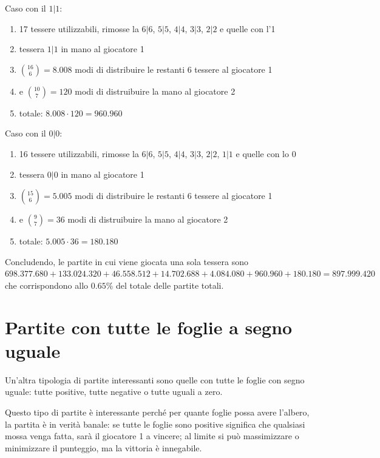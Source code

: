 \documentclass[a4paper,12pt]{report}
\begin{document}
Caso con il \(1|1\):
\begin{enumerate}
    \item 17 tessere utilizzabili, rimosse la \(6|6\), \(5|5\), \(4|4\), \(3|3\), \(2|2\) e quelle con l'1
    \item tessera \(1|1\) in mano al giocatore 1
    \item \(\binom{16}{6} = 8.008\) modi di distribuire le restanti 6 tessere al giocatore 1
    \item e \(\binom{10}{7} = 120\) modi di distruibuire la mano al giocatore 2
    \item totale: \( 8.008 \cdot 120 = 960.960 \)
\end{enumerate}

Caso con il \(0|0\):
\begin{enumerate}
    \item 16 tessere utilizzabili, rimosse la \(6|6\), \(5|5\), \(4|4\), \(3|3\), \(2|2\), \(1|1\) e quelle con lo 0
    \item tessera \(0|0\) in mano al giocatore 1
    \item \(\binom{15}{6} = 5.005\) modi di distribuire le restanti 6 tessere al giocatore 1
    \item e \(\binom{9}{7} = 36\) modi di distruibuire la mano al giocatore 2
    \item totale: \( 5.005 \cdot 36 = 180.180 \)
\end{enumerate}

Concludendo, le partite in cui viene giocata una sola tessera sono \( 698.377.680 + 133.024.320 + 46.558.512 + 14.702.688 + 4.084.080 + 960.960 + 180.180 = 897.999.420\) che corrispondono allo \( 0.65\%\) del totale delle partite totali.

\section{Partite con tutte le foglie a segno uguale}

Un'altra tipologia di partite interessanti sono quelle con tutte le foglie con segno uguale: tutte positive, tutte negative o tutte uguali a zero.

Questo tipo di partite è interessante perché per quante foglie possa avere l'albero, la partita è in verità banale: se tutte le foglie sono positive significa che qualsiasi mossa venga fatta, sarà il giocatore 1 a vincere; al limite si può massimizzare o minimizzare il punteggio, ma la vittoria è innegabile.
\end{document}
